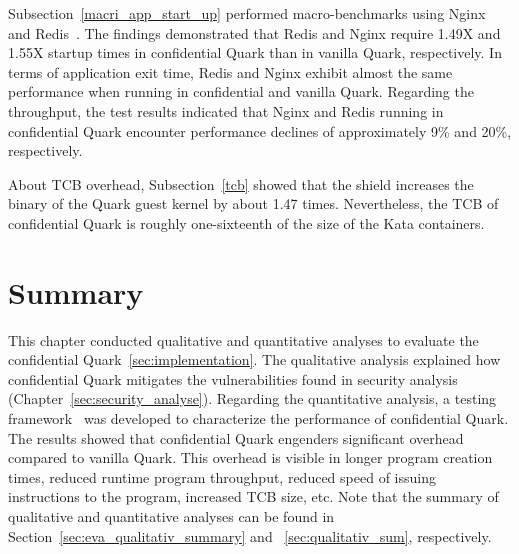 Subsection~\ref*{macri_app_start_up} performed macro-benchmarks using Nginx~\cite*{nginx} and Redis~\cite*{redis}. The findings demonstrated that Redis and Nginx require 1.49X and 1.55X startup times in confidential Quark than in vanilla Quark, respectively. 
In terms of application exit time, Redis and Nginx exhibit almost the same performance when running in confidential and vanilla Quark. Regarding the throughput, the test results indicated that Nginx and Redis running in confidential Quark encounter performance declines of approximately 9\% and 20\%, 
respectively.

About TCB overhead, Subsection~\ref{tcb} showed that the shield increases the binary of the Quark guest kernel by about 1.47 times. Nevertheless, the TCB of confidential Quark is roughly one-sixteenth of the size of the Kata containers. 

\section{Summary}
This chapter conducted qualitative and quantitative analyses to evaluate the confidential Quark~\ref{sec:implementation}. The qualitative analysis explained how confidential Quark mitigates the vulnerabilities found in security analysis (Chapter~\ref{sec:security_analyse}). 
Regarding the quantitative analysis, a testing framework~\cite*{benchamark_framework} was developed to characterize the performance of confidential Quark. The results showed that confidential Quark engenders significant overhead compared to vanilla Quark. 
This overhead is visible in longer program creation times, reduced runtime program throughput, reduced speed of issuing instructions to the program, increased \acrshort{TCB} size, etc. Note that the summary of qualitative and quantitative analyses can be found in Section~\ref*{sec:eva_qualitativ_summary} and ~\ref{sec:qualitativ_sum}, respectively. 





